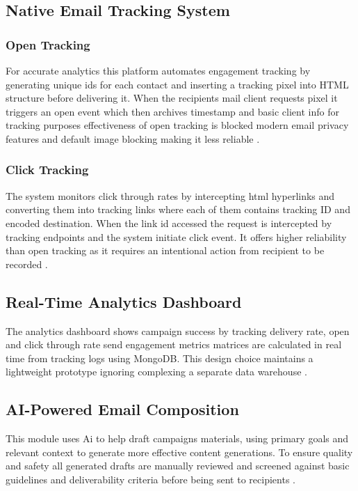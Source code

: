 \documentclass[12pt,journal,compsoc]{IEEEtran}
\begin{document}
\subsection{Native Email Tracking System}

\subsubsection{Open Tracking}
For accurate analytics this platform automates engagement tracking by generating unique ids for each contact and inserting a tracking pixel into HTML structure before delivering it. When the recipients mail client requests pixel it triggers an open event which then archives timestamp and basic client info for tracking purposes effectiveness of open tracking is blocked modern email privacy features and default image blocking making it less reliable \cite{ref15}.

\subsubsection{Click Tracking}
The system monitors click through rates by intercepting html hyperlinks and converting them into tracking links where each of them contains tracking ID and encoded destination. When the link id accessed the request is intercepted by tracking endpoints and the system initiate click event. It offers higher reliability than open tracking as it requires an intentional action from recipient to be recorded \cite{ref16}.

\subsection{Real-Time Analytics Dashboard}
The analytics dashboard shows campaign success by tracking delivery rate, open and click through rate send engagement metrics matrices are calculated in real time from tracking logs using MongoDB. This design choice maintains a lightweight prototype ignoring complexing a separate data warehouse \cite{ref18}.

\subsection{AI-Powered Email Composition}
This module uses Ai to help draft campaigns materials, using primary goals and relevant context to generate more effective content generations. To ensure quality and safety all generated drafts are manually reviewed and screened against basic guidelines and deliverability criteria before being sent to recipients \cite{ref4,ref7}.
\end{document}

